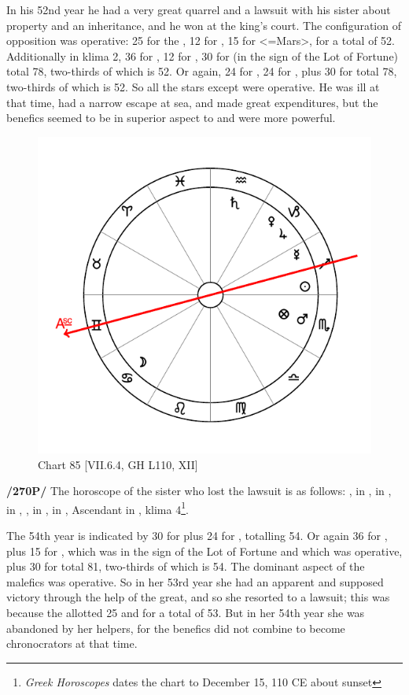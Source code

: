 In his 52nd year he had a very great quarrel and a lawsuit with his sister about property and an inheritance, and he won at the king’s court. The configuration of opposition was operative: 25 for the \Moon, 12 for \Jupiter, 15 for \Scorpio\xspace <=Mars>, for a
total of 52. Additionally in klima 2, 36 for \Scorpio, 12 for \Jupiter, 30 for \Saturn\xspace (in the sign of the Lot of Fortune) total 78, two-thirds of which is 52. Or again, 24 for \Taurus, 24 for \Aquarius, plus 30 for \Saturn total 78, two-thirds of which is 52. So all the stars except \Mars\xspace were operative. He was ill at that time, had a narrow escape at sea, and made great expenditures, but the benefics seemed to be in superior aspect to \Saturn\xspace and were more powerful.

\newpage 
\begin{figure}
\centering
\vspace{0pt}
\includegraphics[width=.68\textwidth]{charts/7_6_04}
\caption{Chart 85 [VII.6.4, GH L110, XII]}
\label{fig:chart85}
\end{figure} 

\noindent\textbf{/270P/} The horoscope of the sister who lost the lawsuit is as follows: \Sun, \Mercury\xspace in \Sagittarius, \Moon\xspace in \Cancer, \Saturn\xspace in \Aquarius, \Jupiter, \Venus\xspace in \Capricorn, \Mars\xspace in \Scorpio, Ascendant in \Gemini, klima 4\footnote{\textit{Greek Horoscopes} dates the chart to December 15, 110 CE about sunset}.

The 54th year is indicated by 30 for \Saturn\xspace plus 24 for \Venus, totalling 54. Or again 36 for \Scorpio, plus 15 for \Mars, which was in the sign of the Lot of Fortune and which was operative, plus 30
for \Saturn\xspace total 81, two-thirds of which is 54. The dominant aspect of the malefics was operative. So in her 53rd year she had an apparent and supposed victory through the help of the great, and so she resorted to a lawsuit; this was because the \Moon\xspace allotted 25 and \Capricorn\xspace 28 for a total of 53. But in her 54th year
she was abandoned by her helpers, for the benefics did not combine to become chronocrators at that time.

